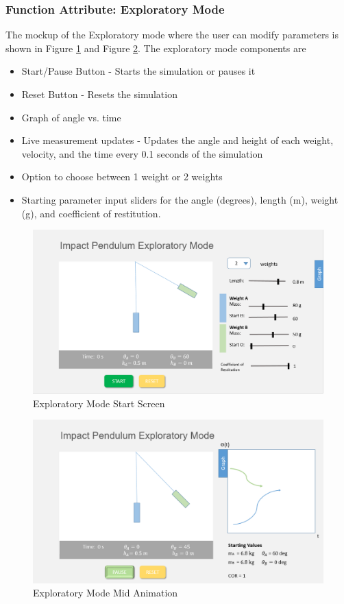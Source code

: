 \subsubsection{Function Attribute: Exploratory Mode}
The mockup of the Exploratory mode where the user can modify parameters is shown in Figure \ref{fig:explore_start} and Figure \ref{fig:explore_mid}. 
The exploratory mode components are
\begin{itemize}
  \item Start/Pause Button - Starts the simulation or pauses it 
    \item Reset Button - Resets the simulation
    \item Graph of angle vs. time 
    \item Live measurement updates  - Updates the angle and height of each weight, velocity, and the time every 0.1 seconds of the simulation
    \item Option to choose between 1 weight or 2 weights
    \item Starting parameter input sliders for the angle (degrees), length (m), weight (g), and coefficient of restitution.
\end{itemize}
\begin{figure}[H]
  \includegraphics[width=\textwidth]{new_explore_s.png}
  \caption{Exploratory Mode Start Screen}
  \label{fig:explore_start}
\end{figure}
\begin{figure}[H]
  \includegraphics[width=\textwidth]{new_explore_mid.png}
  \caption{Exploratory Mode Mid Animation}
  \label{fig:explore_mid}
\end{figure}

